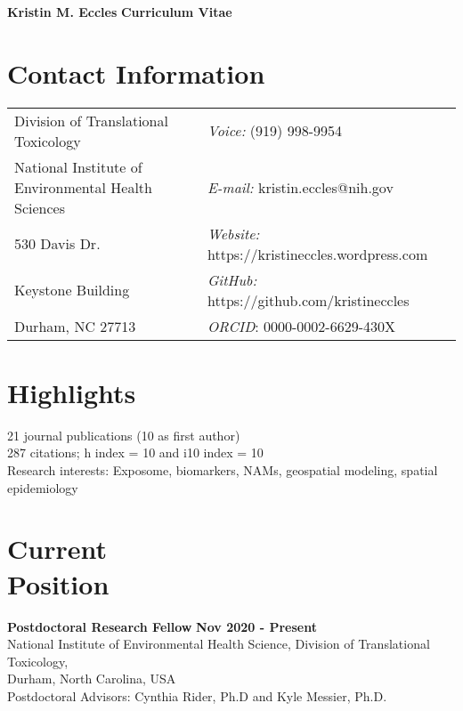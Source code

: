 \documentclass[margin,line]{res}
\begin{document}
\begin{flushleft}
		\huge \textbf{Kristin M. Eccles}
		\hfill {\LARGE \textbf{Curriculum Vitae}}\\
\end{flushleft}


\begin{resume}
\section{\sc Contact Information}
\vspace{.05in}
\begin{tabular}{@{}p{3.2in}p{2.5in}}
Division of Translational Toxicology & {\it Voice:}  (919) 998-9954 \\
National Institute of Environmental Health Sciences & {\it E-mail:}  kristin.eccles@nih.gov\\
530 Davis Dr.&{\it Website:} https://kristineccles.wordpress.com  \\
Keystone Building  & {\it GitHub:} https://github.com/kristineccles \\
Durham, NC 27713 & {\it ORCID}: 0000-0002-6629-430X

\end{tabular}

\vspace*{.1in}
\section{\sc Highlights}
21 journal publications (10 as first author)
\\
287 citations; h index = 10 and i10 index = 10
\\
Research interests: Exposome, biomarkers, NAMs, geospatial modeling, spatial epidemiology

\vspace*{.1in}
\section{\sc Current\\Position}
{\bf  Postdoctoral Research Fellow} \hfill {\bf Nov 2020 - Present}\\
National Institute of Environmental Health Science, Division of Translational Toxicology,\\
Durham, North Carolina, USA\\
Postdoctoral Advisors: Cynthia Rider, Ph.D and Kyle Messier, Ph.D.

\vspace*{.1in}

\end{resume}
\end{document}
